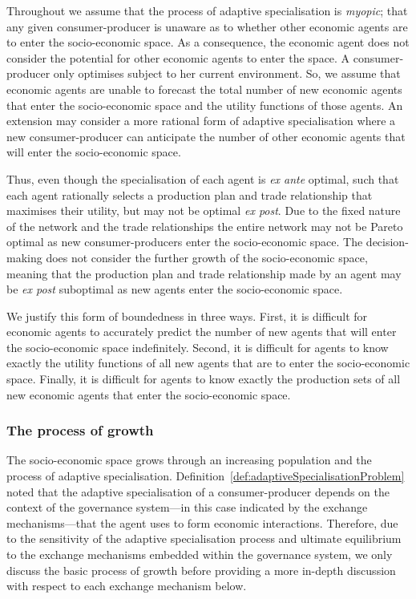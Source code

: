 Throughout we assume that the process of adaptive specialisation is \emph{myopic}; that any given consumer-producer is unaware as to whether other economic agents are to enter the socio-economic space. As a consequence, the economic agent does not consider the potential for other economic agents to enter the space. A consumer-producer only optimises subject to her current environment. So, we assume that economic agents are unable to forecast the total number of new economic agents that enter the socio-economic space and the utility functions of those agents. An extension may consider a more rational form of adaptive specialisation where a new consumer-producer can anticipate the number of other economic agents that will enter the socio-economic space.

Thus, even though the specialisation of each agent is \emph{ex ante} optimal, such that each agent rationally selects a production plan and trade relationship that maximises their utility, but may not be optimal \emph{ex post}. Due to the fixed nature of the network and the trade relationships the entire network may not be Pareto optimal as new consumer-producers enter the socio-economic space. The decision-making does not consider the further growth of the socio-economic space, meaning that the production plan and trade relationship made by an agent may be \emph{ex post} suboptimal as new agents enter the socio-economic space.

We justify this form of boundedness in three ways. First, it is difficult for economic agents to accurately predict the number of new agents that will enter the socio-economic space indefinitely. Second, it is difficult for agents to know exactly the utility functions of all new agents that are to enter the socio-economic space. Finally, it is difficult for agents to know exactly the production sets of all new economic agents that enter the socio-economic space.

\subsubsection{The process of growth}

The socio-economic space grows through an increasing population and the process of adaptive specialisation. Definition~\ref{def:adaptiveSpecialisationProblem} noted that the adaptive specialisation of a consumer-producer depends on the context of the governance system---in this case indicated by the exchange mechanisms---that the agent uses to form economic interactions. Therefore, due to the sensitivity of the adaptive specialisation process and ultimate equilibrium to the exchange mechanisms embedded within the governance system, we only discuss the basic process of growth before providing a more in-depth discussion with respect to each exchange mechanism below.

